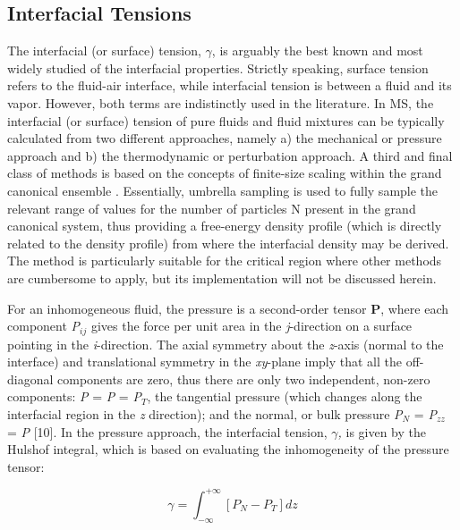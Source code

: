 \documentclass[9pt,bestpractices]{livecoms}
\begin{document}
\subsection{Interfacial Tensions}

The interfacial (or surface) tension, $\gamma$, is arguably the best known and
most widely studied of the interfacial properties. Strictly speaking, surface
tension refers to the fluid-air interface, while interfacial tension is between
a fluid and its vapor. However, both terms are indistinctly used in the
literature. In MS, the interfacial (or surface) tension of pure fluids and
fluid mixtures can be typically calculated from two different approaches,
namely a) the mechanical or pressure approach and b) the thermodynamic or
perturbation approach. A third and final class of methods is based on the
concepts of finite-size scaling within the grand canonical ensemble 
\citep{binder1982,errington2003}. Essentially, umbrella
sampling is used to fully sample the relevant range of values for the number of
particles N present in the grand canonical system, thus providing a free-energy
density profile (which is directly related to the density profile) from where
the interfacial density may be derived. The method is particularly suitable for
the critical region where other methods are cumbersome to apply, but its
implementation \cite{allen2017,schrader2009} will not be discussed
herein.

For an inhomogeneous fluid, the pressure is a second-order tensor \textbf{P},
where each component \textit{P}$_{ij}$ gives the force per unit area in the
\textit{j}-direction on a surface pointing in the \textit{i}-direction. The
axial symmetry about the \textit{z}-axis (normal to the interface) and
translational symmetry in the \textit{xy}-plane imply that all the off-diagonal
components are zero, thus there are only two independent, non-zero components:
\textit{P}\textit{} = \textit{P}\textit{}
= \textit{P}$_{T}$, the tangential pressure (which changes along the
interfacial region in the \textit{z} direction); and the normal, or bulk
pressure \textit{P}$_{N}$ = \textit{P}$_{zz}$ = \textit{P} [10]. In the
pressure approach, the interfacial tension, $\gamma$\textit{,} is given by the
Hulshof integral\citep{hulshof1901}, which
is based on evaluating the inhomogeneity of the pressure tensor:

\begin{equation}
\gamma=\int_{-\infty}^{+\infty}\left[P_{N}-P_{T}\right]dz
\end{equation}
\end{document}
